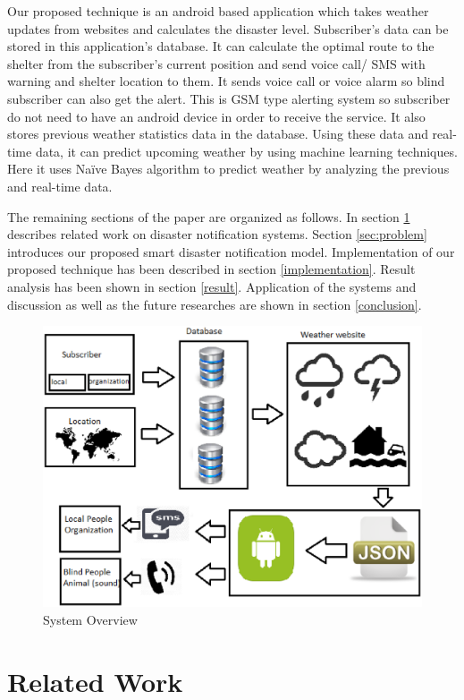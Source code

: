 \documentclass[conference]{IEEEtran}
\begin{document}
Our proposed technique is an android based application which takes weather updates from websites and calculates the disaster level. Subscriber’s data can be stored in this application’s database. It can calculate the optimal route to the shelter from the subscriber’s current position and send voice call/ SMS with warning and shelter location to them. It sends voice call or voice alarm so blind subscriber can also get the alert. This is GSM type alerting system so subscriber do not need to have an android device in order to receive the service. It also stores previous weather statistics data in the database. Using these data and real-time data, it can predict upcoming weather by using machine learning techniques. Here it uses Naïve Bayes algorithm \cite{wiki:naive} to predict weather by analyzing the previous and real-time data. 

The remaining sections of the paper are organized as follows. In section \ref{relatedworks} describes related work on disaster notification systems. Section \ref{sec:problem} introduces our proposed smart disaster notification model. Implementation of our proposed technique has been described in section \ref{implementation}. Result analysis has been shown in section \ref{result}. Application of the systems and discussion as well as the future researches are shown in section \ref{conclusion}.
  
\begin{figure}[htp]
	\centering
		\includegraphics[width=.95\textwidth]{fig/architecture.eps}
	\caption{ System Overview }
	\label{Figure:overview}
\end{figure}


\section {Related Work}
\label {relatedworks}
\end{document}

